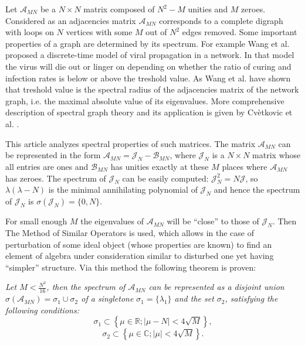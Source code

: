 Let \( \mathscr{A}_{MN} \) be a \( N\times N \) matrix composed of
\( N^2 - M \) unities and \( M \) zeroes.
Considered as an adjacencies matrix \( \mathscr{A}_{MN} \)
corresponds to a complete digraph with loops on \( N \) vertices
with some \( M \) out of \( N^2 \) edges removed.
Some important properties of a graph are determined by its spectrum.
For example Wang et al. \cite{epidemic} proposed a discrete-time model
of viral propagation in a network.
In that model the virus will die out or linger on
depending on whether the ratio of curing and infection rates
is below or above the treshold value.
As Wang et al. have shown that treshold value
is the spectral radius of the adjacencies matrix of the network graph,
i.e. the maximal absolute value of its eigenvalues.
More comprehensive description of spectral graph theory
and its application is given by Cv\`etkovic et al. \cite{cvet}.

This article analyzes spectral properties of such matrices.
The matrix \( \mathscr{A}_{MN} \) can be represented in the form
\( \mathscr{A}_{MN} = \mathcal{J}_N - \mathscr{B}_{MN} \),
where \( \mathcal{J}_N \) is a \( N\times N \) matrix
whose all entries are ones
and \( \mathcal{B}_{MN} \) has unities exactly at these \( M \)
places where \( \mathscr{A}_{MN} \) has zeroes.
The spectrum of \( \mathcal{J}_N \) can be easily computed:
\( \mathcal{J}_N^2 = N \mathcal{J} \),
so \( \lambda(\lambda - N) \) is the minimal
annihilating polynomial of \( \mathcal{J}_N \)
and hence the spectrum of \( \mathcal{J}_{N} \) is
\( \sigma(\mathcal{J}_N) = \{ 0,N \} \).

For small enough \( M \) the eigenvalues of \( \mathscr{A}_{MN} \)
will be ``close'' to those of \( \mathcal{J}_N \).
Then The Method of Similar Operators \cite{baskakov-harmonic,baskakov-split} is used,
which allows in the case of perturbation of some ideal object (whose properties are known)
to find an element of algebra under consideration similar to disturbed one
yet having ``simpler'' structure.
Via this method the following theorem is proven:
\begin{center}
\it
    Let \( M < \frac{N^2}{16} \),
    then the spectrum of \( \mathscr{A}_{MN} \) can be represented as a disjoint union
    \( \sigma\left(\mathscr{A}_{MN}\right) = \sigma_1 \cup \sigma_2 \)
    of a singletone \( \sigma_1=\{\lambda_1\} \)
    and the set \( \sigma_2 \), satisfying the following conditions:
    \[ \sigma_1 \subset \left\{ \mu\in\mathbb{R}; \lvert \mu - N \rvert < 4\sqrt{M} \right\}, \]
    \[ \sigma_2 \subset \left\{ \mu\in\mathbb{C}; \lvert \mu \rvert < 4\sqrt{M} \right\}. \]
\end{center}
